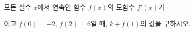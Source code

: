 모든 실수 $x$에서 연속인 함수 $f(x)$의 도함수 $f'(x)$가 \par\smallskip{}\par\smallskip\noindent 이고 $f(0)=-2$, $f(2)=6$일 때, $k+f(1)$의 값을 구하시오. 

